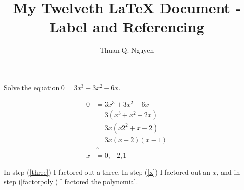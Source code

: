 \documentclass{article}
\begin{document}
\title{My Twelveth \LaTeX{} Document - Label and Referencing}
\author{Thuan Q. Nguyen}
\maketitle


Solve the equation $0 = 3x^3+3x^2-6x$.

\begin{align}
	0 &= 3x^3+3x^2-6x 	\\
	&= 3(x^3 +x^2-2x) 	\label{three} 		\\
	&= 3x(x2^2+x-2)	\label{x} 			\\
	&= 3x(x+2) (x-1)	\label{factorpoly} 	\\
	& \therefore 		\nonumber		\\
	x &= 0, -2, 1
\end{align}

In step (\ref{three}) I factored out a three. In step (\ref{x}) I factored out an $x$, and in step (\ref{factorpoly}) I factored the polynomial.
\end{document}
